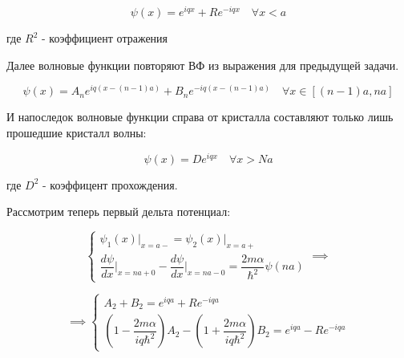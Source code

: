 \documentclass[a4paper, 12pt]{article}
\begin{document}
	\begin{equation}
		\psi(x) = e^{iqx} + R e^{-iqx} \quad \forall x < a
	\end{equation}
	
	\begin{center}
		где $R^2$ - коэффициент отражения 
	\end{center}
	
	\quad Далее волновые функции повторяют ВФ из выражения для предыдущей задачи. 
	
	\begin{equation}
		\psi (x) = A_n e^{iq(x-(n-1)a)} + B_n e^{-iq(x-(n-1)a)} \quad \forall x \in [(n-1)a, na]
	\end{equation}
	
	\quad И напоследок волновые функции справа от кристалла составляют только лишь прошедшие кристалл волны:
	
	\begin{equation}
		\psi (x) = D e^{iqx} \quad \forall x > Na 
	\end{equation}
	
	\begin{center}
		где $D^2$ - коэффицент прохождения.
	\end{center}
	
	\quad Рассмотрим теперь первый дельта потенциал: 
	
	\begin{equation}
		\begin{cases}
			\psi_1 (x)\bigg|_{x=a-} = \psi_2 (x) \bigg|_{x=a+} \\
			\dfrac{d\psi }{dx} \bigg|_{x = na+0} - \dfrac{d\psi }{dx} \bigg|_{x = na-0} = \dfrac{2 m \alpha}{\hbar^2}\psi(na)
		\end{cases} \implies
	\end{equation}
	
	\begin{equation}
		\implies \begin{cases}
			A_2 + B_2 = e^{iqa} + Re^{-iqa} \\
			\left(1 - \dfrac{2m\alpha}{iq\hbar^2}\right) A_2 - \left(1 + \dfrac{2m\alpha}{iq\hbar^2}\right) B_2 = e^{iqa} - Re^{-iqa}
		\end{cases}
	\end{equation}
	
\end{document}
